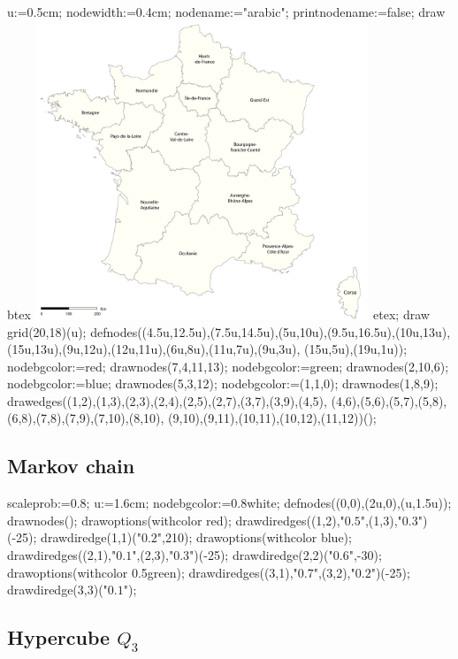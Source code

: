 \documentclass[11pt,a4paper,english]{article}
\begin{document}
\begin{exemple}
u:=0.5cm;
nodewidth:=0.4cm;
nodename:="arabic";
printnodename:=false;
draw btex \includegraphics[width=10cm]{france-region.jpg} etex;
draw grid(20,18)(u);
defnodes((4.5u,12.5u),(7.5u,14.5u),(5u,10u),(9.5u,16.5u),(10u,13u),
          (15u,13u),(9u,12u),(12u,11u),(6u,8u),(11u,7u),(9u,3u),
          (15u,5u),(19u,1u));
nodebgcolor:=red;
drawnodes(7,4,11,13);
nodebgcolor:=green;
drawnodes(2,10,6);
nodebgcolor:=blue;
drawnodes(5,3,12);
nodebgcolor:=(1,1,0);
drawnodes(1,8,9);
drawedges((1,2),(1,3),(2,3),(2,4),(2,5),(2,7),(3,7),(3,9),(4,5),
          (4,6),(5,6),(5,7),(5,8),(6,8),(7,8),(7,9),(7,10),(8,10),
          (9,10),(9,11),(10,11),(10,12),(11,12))();
\end{exemple}



\subsection*{Markov chain}

\begin{exemple}[lefthand ratio = 0.6]
scaleprob:=0.8;
u:=1.6cm;
nodebgcolor:=0.8white;
defnodes((0,0),(2u,0),(u,1.5u));
drawnodes();
drawoptions(withcolor red);
drawdiredges((1,2),"$0.5$",(1,3),"$0.3$")(-25);
drawdiredge(1,1)("$0.2$",210);
drawoptions(withcolor blue);
drawdiredges((2,1),"$0.1$",(2,3),"$0.3$")(-25);
drawdiredge(2,2)("$0.6$",-30);
drawoptions(withcolor 0.5green);
drawdiredges((3,1),"$0.7$",(3,2),"$0.2$")(-25);
drawdiredge(3,3)("$0.1$");
\end{exemple}

\subsection*{Hypercube $Q_3$}
\end{document}

